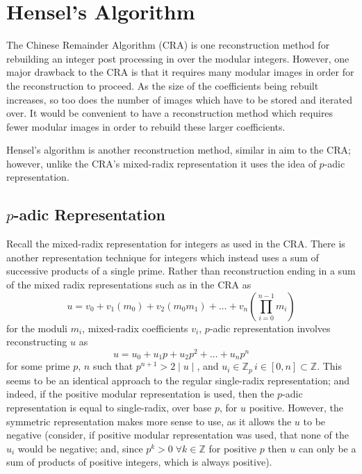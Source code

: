 \documentclass[letterpaper,12pt,titlepage,oneside,final]{book}
\begin{document}
\section{Hensel's Algorithm}

The Chinese Remainder Algorithm (CRA) is one reconstruction method for rebuilding an integer post processing in over the modular integers.  However, one major drawback to the CRA is that it requires many modular images in order for the reconstruction to proceed.  As the size of the coefficients being rebuilt increases, so too does the number of images which have to be stored and iterated over.  It would be convenient to have a reconstruction method which requires fewer modular images in order to rebuild these larger coefficients.   

Hensel's algorithm is another reconstruction method, similar in aim to the CRA; however, unlike the CRA's mixed-radix representation it uses the idea of ${p}$-adic representation.

\subsection{${p}$-adic Representation}

Recall the mixed-radix representation for integers as used in the CRA.  There is another representation technique for integers which instead uses a sum of successive products of a single prime.  Rather than reconstruction ending in a sum of the mixed radix representations such as in the CRA as
\begin{equation*}
  u = v_0 + v_1(m_0) + v_2(m_0m_1) + \ldots + v_n(\prod_{i=0}^{n-1}m_i)
\end{equation*}
for the moduli ${m_i}$, mixed-radix coefficients ${v_i}$, ${p}$-adic representation involves reconstructing ${u}$ as 
\begin{equation*}
  u = u_0 + u_1p + u_2p^2 + \ldots + u_np^n
\end{equation*}
for some prime ${p}$, ${n}$ such that ${p^{n+1} > 2 \mid u \mid}$, and ${u_i \in \mathbb{Z}_p\, i \in [0, n] \subset \mathbb{Z}}$.  This seems to be an identical approach to the regular single-radix representation; and indeed, if the positive modular representation is used, then the ${p}$-adic representation is equal to single-radix, over base ${p}$, for ${u}$ positive.  However, the symmetric representation makes more sense to use, as it allows the ${u}$ to be negative (consider, if positive modular representation was used, that none of the ${u_i}$ would be negative; and, since ${p^k > 0 \; \forall k \in \mathbb{Z}}$ for positive ${p}$ then ${u}$ can only be a sum of products of positive integers, which is always positive).  
\end{document}
